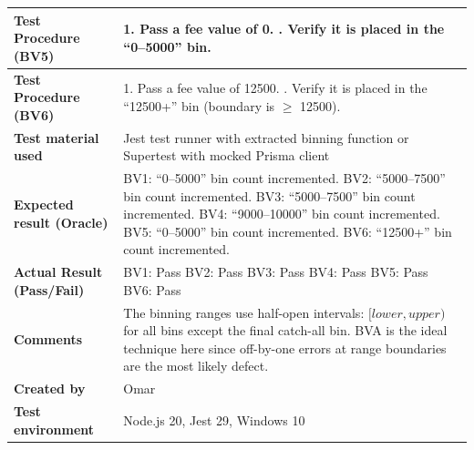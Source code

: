\begin{table}[h!]
\begin{tabular}{|p{}|p{}|}
\textbf{Test Procedure (BV5)} & 1. Pass a fee value of 0. \newline 2. Verify it is placed in the ``0--5000'' bin. \\ \hline
\textbf{Test Procedure (BV6)} & 1. Pass a fee value of 12500. \newline 2. Verify it is placed in the ``12500+'' bin (boundary is $\geq$ 12500). \\ \hline
\textbf{Test material used} & Jest test runner with extracted binning function or Supertest with mocked Prisma client \\ \hline
\textbf{Expected result (Oracle)} & BV1: ``0--5000'' bin count incremented. \newline BV2: ``5000--7500'' bin count incremented. \newline BV3: ``5000--7500'' bin count incremented. \newline BV4: ``9000--10000'' bin count incremented. \newline BV5: ``0--5000'' bin count incremented. \newline BV6: ``12500+'' bin count incremented. \\ \hline
\textbf{Actual Result (Pass/Fail)} & BV1: Pass \newline BV2: Pass \newline BV3: Pass \newline BV4: Pass \newline BV5: Pass \newline BV6: Pass \\ \hline
\textbf{Comments} & The binning ranges use half-open intervals: $[lower, upper)$ for all bins except the final catch-all bin. BVA is the ideal technique here since off-by-one errors at range boundaries are the most likely defect. \\ \hline
\textbf{Created by} & Omar \\ \hline
\textbf{Test environment} & Node.js 20, Jest 29, Windows 10 \\ \hline
\end{tabular}
\end{table}

